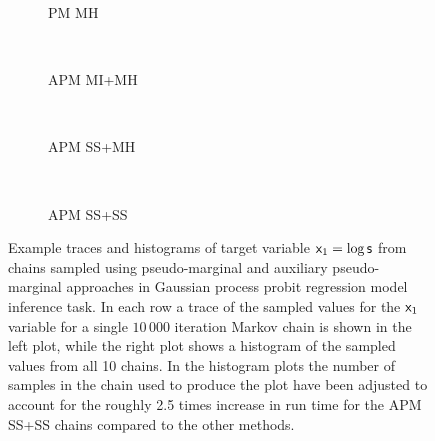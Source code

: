 \begin{figure}
\centering
\begin{subfigure}[b]{\linewidth}
\centering
  \vspace{-5mm}
  \caption{\ac{PM} \ac{MH}}
  \label{sfig:pmmh-gaussian-process-x0-trace}
\end{subfigure}
\\[3mm]
\begin{subfigure}[b]{\linewidth}
\centering
  \vspace{-5mm}
  \caption{\ac{APM} \ac{MI}+\ac{MH}}
  \label{sfig:apm-mi-mh-gaussian-process-x0-trace}
\end{subfigure}
\\[3mm]
\begin{subfigure}[b]{\linewidth}
\centering
  \vspace{-5mm}
  \caption{\ac{APM} \ac{SS}+\ac{MH}}
  \label{sfig:apm-ss-mh-gaussian-process-x0-trace}
\end{subfigure}
\\[3mm]
\begin{subfigure}[b]{\linewidth}
\centering
  \vspace{-5mm}
  \caption{\ac{APM} \ac{SS}+\ac{SS}}
  \label{sfig:apm-ss-ss-gaussian-process-x0-trace}
\end{subfigure}
\caption[Gaussian process probit regression traces.]{
Example traces and histograms of target variable $\mathsf{x}_1 = \log\mathsf{s}$ from chains sampled using pseudo-marginal and auxiliary pseudo-marginal approaches in Gaussian process probit regression model inference task. In each row a trace of the sampled values for the $\mathsf{x}_1$ variable for a single $10\,000$ iteration Markov chain is shown in the left plot, while the right plot shows a histogram of the sampled values from all 10 chains. In the histogram plots the number of samples in the chain used to produce the plot have been adjusted to account for the roughly 2.5 times increase in run time for the \ac{APM} \ac{SS}+\ac{SS} chains compared to the other methods.}
\label{fig:pm-gaussian-process-traces}
\end{figure}

